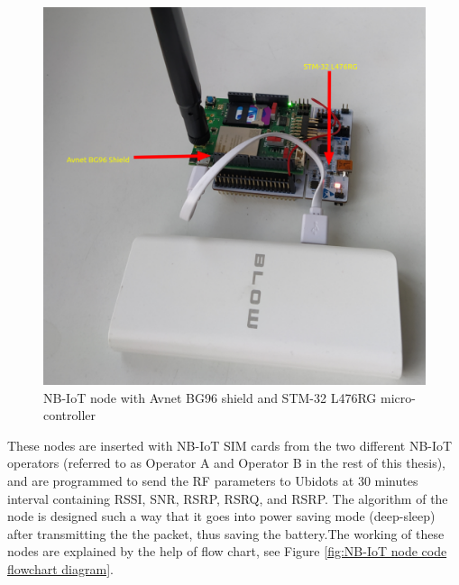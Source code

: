 \documentclass[12pt]{article}
\begin{document}
\begin{figure}[H]
    \centering
    \includegraphics[trim=1cm 0cm 2cm 1cm,clip=true,width=0.9\columnwidth,totalheight=8cm ,width=0.9\columnwidth,keepaspectratio]{Images/nb-iotNode.pdf}
    \caption{NB-IoT node with Avnet BG96 shield and STM-32 L476RG micro-controller}
    \label{fig:NB-IoT node with Avnet BG96 shield and STM-32 L476RG micro-controller}
\end{figure}

These nodes are inserted with NB-IoT SIM cards from the two different NB-IoT operators (referred to as Operator A and Operator B in the rest of this thesis), and are programmed to send the RF parameters to Ubidots \cite{ubidots} at 30 minutes interval containing RSSI, SNR, RSRP, RSRQ, and RSRP. The algorithm of the node is designed such a way that it goes into power saving mode (deep-sleep) after transmitting the the packet, thus saving the battery.The working of these nodes are explained by the help of flow chart, see Figure \ref{fig:NB-IoT node code flowchart diagram}. 
\end{document}
